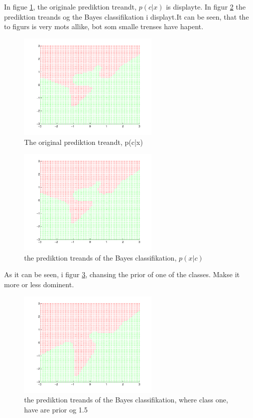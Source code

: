 In figue \ref{fig:q23a}, the originale prediktion treandt, $p(c|x)$ is
displayte. In figur \ref{fig:q23b} the prediktion treands og the Bayes
classifikation i displayt.It can be seen, that the to figurs is very
mots allike, bot som smalle trenses have hapent.

\begin{figure}[!htbp]
  \centering
  \includegraphics[width=0.6\textwidth]{./images/q23a.pdf}
  \caption{The original prediktion treandt, p(c|x)}
  \label{fig:q23a}
\end{figure}

\begin{figure}[!htbp]
  \centering
  \includegraphics[width=0.6\textwidth]{./images/q23b.pdf}
  \caption{the prediktion treands of the Bayes classifikation, $p(x|c)$}
  \label{fig:q23b}
\end{figure}

As it can be seen, i figur \ref{fig:q23c}, chansing the prior of one of
the classes. Makse it more or less dominent.

\begin{figure}[!htbp]
  \centering
  \includegraphics[width=0.6\textwidth]{./images/q23c.pdf}
  \caption{the prediktion treands of the Bayes classifikation, where class one, have are prior og 1.5}
  \label{fig:q23c}
\end{figure}
